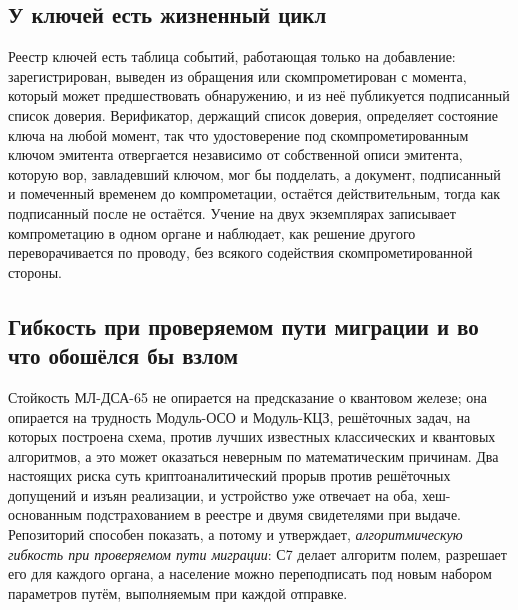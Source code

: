 \subsection{У ключей есть жизненный цикл}

Реестр ключей есть таблица событий, работающая только на добавление: зарегистрирован, выведен из
обращения или скомпрометирован с момента, который может предшествовать обнаружению, и из неё
публикуется подписанный список доверия. Верификатор, держащий список доверия, определяет состояние
ключа на любой момент, так что удостоверение под скомпрометированным ключом эмитента отвергается
независимо от собственной описи эмитента, которую вор, завладевший ключом, мог бы подделать, а
документ, подписанный и помеченный временем до компрометации, остаётся действительным, тогда как
подписанный после не остаётся. Учение на двух экземплярах записывает компрометацию в одном органе
и наблюдает, как решение другого переворачивается по проводу, без всякого содействия
скомпрометированной стороны. \sImpl

\subsection{Гибкость при проверяемом пути миграции и во что обошёлся бы взлом}

Стойкость МЛ-ДСА-65 не опирается на предсказание о квантовом железе; она опирается на трудность Модуль-ОСО и
Модуль-КЦЗ, решёточных задач, на которых построена схема, против лучших известных классических и квантовых алгоритмов, а это может оказаться
неверным по математическим причинам. Два настоящих риска суть криптоаналитический прорыв против
решёточных допущений и изъян реализации, и устройство уже отвечает на оба, хеш-основанным
подстрахованием в реестре и двумя свидетелями при выдаче. Репозиторий способен показать, а потому и утверждает, \emph{алгоритмическую гибкость при
проверяемом пути миграции}: С7 делает алгоритм полем,  разрешает его
для каждого органа, а население можно переподписать под новым набором параметров путём,
выполняемым при каждой отправке. \sImpl


